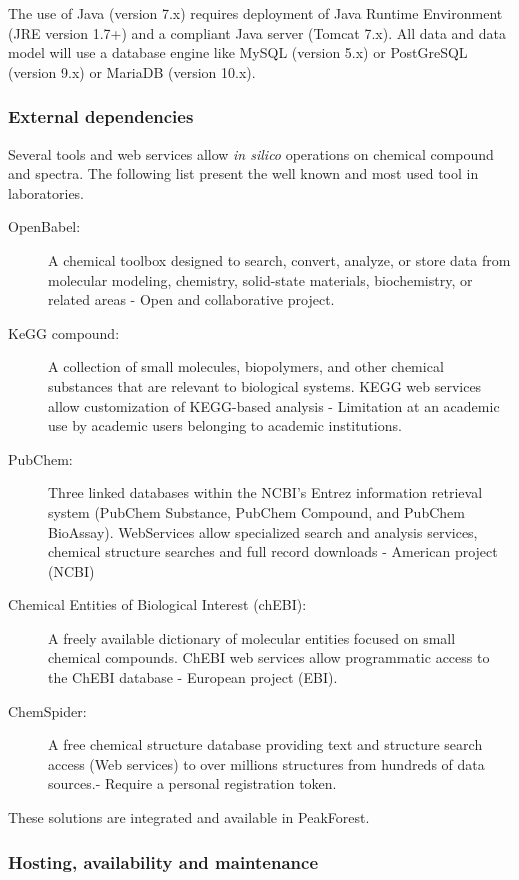 The use of Java (version 7.x) requires deployment of Java Runtime Environment (JRE version 1.7+) and a compliant Java server (Tomcat 7.x).
All data and data model will use a database engine like MySQL (version 5.x) or PostGreSQL (version 9.x) or MariaDB (version 10.x).


\subsubsection{External dependencies}

Several tools and web services allow {\itshape in silico} operations on chemical compound and spectra. The following list present  the well known and most used tool in laboratories.

\begin{description}
	\item [OpenBabel:]  A chemical toolbox designed to  search, convert, analyze, or store data from molecular modeling, chemistry, solid-state materials, biochemistry, or related areas - Open and collaborative project.
	\item [KeGG compound:] A collection of small molecules, biopolymers, and other chemical substances that are relevant to biological systems. KEGG web services allow customization of KEGG-based analysis - Limitation at an academic use by academic users belonging to academic institutions.
	\item [PubChem:] Three linked databases within the NCBI's Entrez information retrieval system (PubChem Substance, PubChem Compound, and PubChem BioAssay). WebServices allow specialized search and analysis services,  chemical structure searches and full record downloads - American project (NCBI)
	\item [Chemical Entities of Biological Interest  (chEBI):] A freely available dictionary of molecular entities focused on small chemical compounds. ChEBI web services allow programmatic access to the ChEBI database - European project (EBI).
	\item [ChemSpider:] A free chemical structure database providing text and structure search access (Web services) to over millions structures from hundreds of data sources.- Require a personal registration token.
\end{description}

These solutions are integrated and available in PeakForest.


\subsubsection{Hosting, availability and maintenance}


